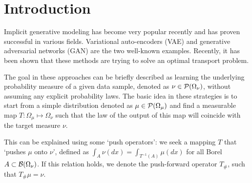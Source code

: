 
\section{Introduction}



Implicit generative modeling has become very popular recently and has proven successful in various fields. Variational auto-encoders (VAE) and generative adversarial networks (GAN) are the two well-known examples. Recently, it has been shown that these methods are trying to solve an optimal transport problem.


The goal in these approaches can be briefly described as learning the underlying probability measure of a given data sample, denoted as $\nu \in {\cal P}(\Omega_\nu)$, without assuming any explicit probability laws. The basic idea in these strategies is to start from a simple distribution denoted as $\mu \in {\cal P}(\Omega_\mu)$ and find a measurable map $T: \Omega_\mu \mapsto \Omega_\nu$ such that the law of the output of this map will coincide with the target measure $\nu$. 

This can be explained using some `push operators': we seek a mapping $T$ that `pushes $\mu$ onto $\nu$', defined as $\int_A \nu(dx) = \int_{T^{-1}(A)} \mu(dx) $ for all Borel $A \subset {\cal B}(\Omega_\nu)$. If this relation holds, we denote the push-forward operator $T_\#$, such that $T_\# \mu = \nu$.

